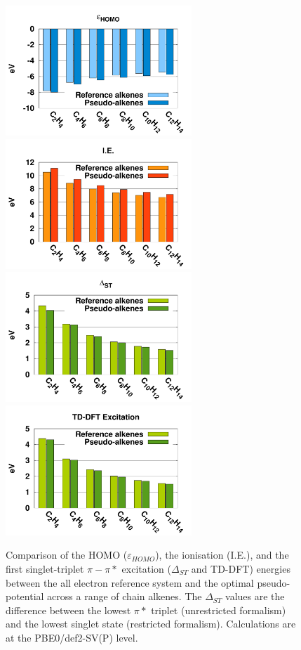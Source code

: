 \documentclass[aip,reprint]{revtex4-1}
\begin{document}
\begin{figure}
\begin{center}
\includegraphics[width=7cm]{short_pbe0_homo}
\includegraphics[width=7cm]{short_pbe0_ie}
\includegraphics[width=7cm]{short_pbe0_st}
\includegraphics[width=7cm]{short_pbe0_tddft}
\end{center}
\caption{Comparison of the HOMO ($\varepsilon_{HOMO}$),
the ionisation (I.E.), and
the first singlet-triplet $\pi-\pi*$ excitation ($\Delta_{ST}$ and TD-DFT) energies
between the
all electron reference system and the optimal pseudo-potential across a range of chain alkenes.
The $\Delta_{ST}$ values are the difference
between the lowest $\pi*$ triplet (unrestricted formalism) and the lowest singlet state
(restricted formalism).
Calculations are at the PBE0/def2-SV(P) level.}
\label{fig:alkenes_hf_dft}
\end{figure}
\end{document}
